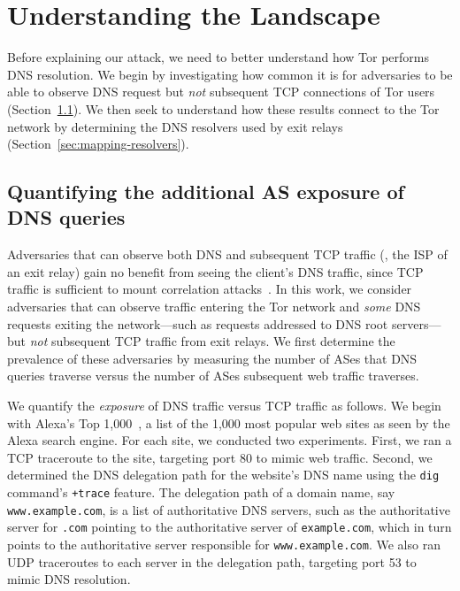 \section{Understanding the Landscape}
\label{sec:landscape}

Before explaining our attack, we need to better understand how Tor performs DNS
resolution.  We begin by investigating how common it is for adversaries
to be able to observe DNS request but \emph{not} subsequent TCP connections of
Tor users (Section~\ref{sec:as-exposure}).  We then seek to understand how
these results connect to the Tor network by determining the DNS resolvers used
by exit relays (Section~\ref{sec:mapping-resolvers}).

\subsection{Quantifying the additional AS exposure of DNS queries}
\label{sec:as-exposure}

Adversaries that can observe both DNS and subsequent TCP traffic (\eg, the ISP
of an exit relay) gain no benefit from seeing the client's DNS traffic,
since TCP traffic is sufficient to mount correlation
attacks~\cite{Murdoch2007a}.  In this work, we consider
adversaries that can observe traffic entering the Tor network and \emph{some}
DNS requests exiting the network---such as requests addressed to DNS
root servers---but {\em not} subsequent TCP traffic from exit relays.
We first determine the prevalence of these adversaries by measuring the
number of ASes that DNS queries traverse versus the
number of ASes subsequent web traffic traverses.

We quantify the {\em exposure} of DNS traffic versus TCP traffic as follows.  We begin with
Alexa's Top 1,000~\cite{alexatop1k}, a list of the 1,000 most popular web sites
as seen by the Alexa search engine.  For each site, we conducted two
experiments.  First, we ran a TCP traceroute to the site, targeting port 80 to
mimic web traffic.  Second, we determined the DNS delegation path for
the website's DNS name using
the {\tt dig} command's \texttt{+trace} feature.  The delegation path of a domain
name, say {\tt www.example.com}, is a list of authoritative DNS servers, such as the
authoritative server for {\tt .com} pointing to the authoritative server of
{\tt example.com}, which in turn points to the authoritative server responsible for
{\tt www.example.com}.  We also ran UDP traceroutes to each server in the delegation path,
targeting port 53 to mimic DNS resolution.


